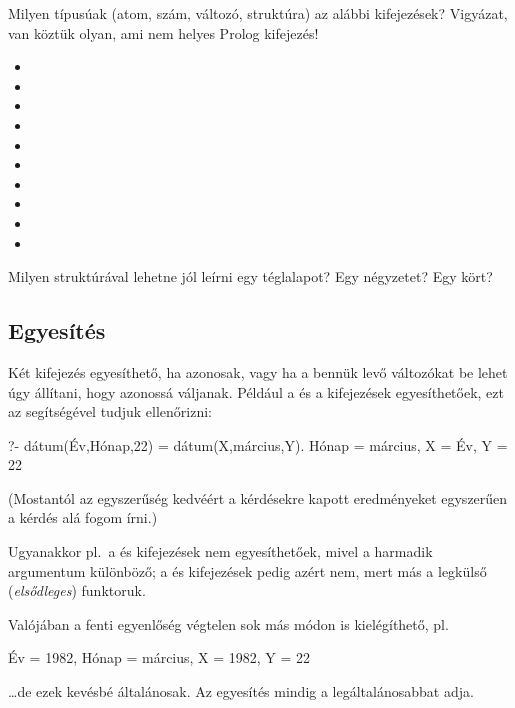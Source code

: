 \begin{problem}
Milyen típusúak (atom, szám, változó, struktúra) az
alábbi kifejezések? Vigyázat, van köztük olyan, ami
nem helyes Prolog kifejezés!
\begin{itemize}
\item {}
\item {}
\item {}
\item {}
\item {}
\item {}
\item {}
\item {}
\item {}
\item {}
\end{itemize}
\end{problem}
\begin{problem}
Milyen struktúrával lehetne jól leírni egy
téglalapot? Egy négyzetet? Egy kört?
\end{problem}

\subsection*{Egyesítés}
Két kifejezés egyesíthető, ha azonosak, vagy ha a
bennük levő változókat be lehet úgy állítani, hogy
azonossá váljanak. Például a 
és a  kifejezések
egyesíthetőek, ezt az \pr{=} segítségével tudjuk
ellenőrizni:\index{\pr{=}}
\begin{query}
?- dátum(Év,Hónap,22) = dátum(X,március,Y).
Hónap = március,
X = Év,
Y = 22
\end{query}
(Mostantól az egyszerűség kedvéért a kérdésekre
kapott eredményeket egyszerűen a kérdés alá fogom
írni.)

Ugyanakkor pl.~a  és
 kifejezések nem egyesíthetőek,
mivel a harmadik argumentum különböző; a
 és  kifejezések
pedig azért nem, mert más a legkülső
(\emph{elsődleges}) funktoruk.

Valójában a fenti egyenlőség végtelen sok más módon
is kielégíthető, pl.
\begin{query}
Év = 1982,
Hónap = március,
X = 1982,
Y = 22
\end{query}
\dots de ezek kevésbé általánosak. Az egyesítés
mindig a legáltalánosabbat adja.

